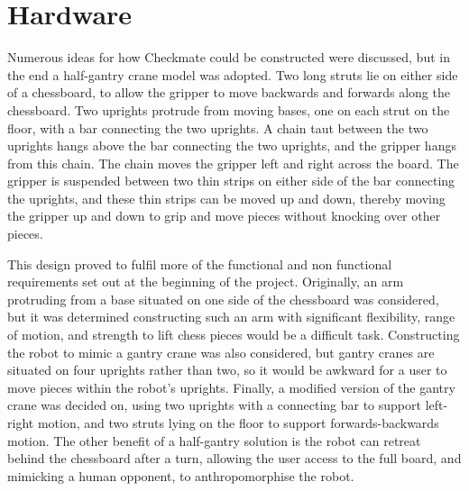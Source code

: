 \documentclass[onecolumn]{IEEEtran}
\begin{document}
\section{Hardware}
Numerous ideas for how Checkmate could be constructed were discussed, but in the end a half-gantry crane model was adopted. Two long struts lie on either side of a chessboard, to allow the gripper to move backwards and forwards along the chessboard. Two uprights protrude from moving bases, one on each strut on the floor, with a bar connecting the two uprights. A chain taut between the two uprights hangs above the bar connecting the two uprights, and the gripper hangs from this chain. The chain moves the gripper left and right across the board. The gripper is suspended between two thin strips on either side of the bar connecting the uprights, and these thin strips can be moved up and down, thereby moving the gripper up and down to grip and move pieces without knocking over other pieces. \par
This design proved to fulfil more of the functional and non functional requirements set out at the beginning of the project. Originally, an arm protruding from a base situated on one side of the chessboard was considered, but it was determined constructing such an arm with significant flexibility, range of motion, and strength to lift chess pieces would be a difficult task. Constructing the robot to mimic a gantry crane was also considered, but gantry cranes are situated on four uprights rather than two, so it would be awkward for a user to move pieces within the robot's uprights. Finally, a modified version of the gantry crane was decided on, using two uprights with a connecting bar to support left-right motion, and two struts lying on the floor to support forwards-backwards motion. The other benefit of a half-gantry solution is the robot can retreat behind the chessboard after a turn, allowing the user access to the full board, and mimicking a human opponent, to anthropomorphise the robot. \par
\end{document}
